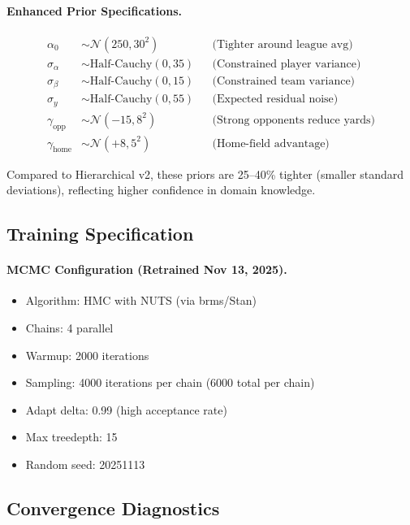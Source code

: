 \paragraph{Enhanced Prior Specifications.}
\begin{align}
\label{eq:ip-priors}
\alpha_0 &\sim \mathcal{N}(250, 30^2) && \text{(Tighter around league avg)} \\
\sigma_\alpha &\sim \text{Half-Cauchy}(0, 35) && \text{(Constrained player variance)} \\
\sigma_\beta &\sim \text{Half-Cauchy}(0, 15) && \text{(Constrained team variance)} \\
\sigma_y &\sim \text{Half-Cauchy}(0, 55) && \text{(Expected residual noise)} \\
\gamma_{\text{opp}} &\sim \mathcal{N}(-15, 8^2) && \text{(Strong opponents reduce yards)} \\
\gamma_{\text{home}} &\sim \mathcal{N}(+8, 5^2) && \text{(Home-field advantage)}
\end{align}

\noindent Compared to Hierarchical v2, these priors are 25--40\% tighter (smaller standard deviations), reflecting higher confidence in domain knowledge.

\subsection{Training Specification}

\paragraph{MCMC Configuration (Retrained Nov 13, 2025).}
\begin{itemize}[itemsep=1pt,parsep=0pt]
    \item Algorithm: HMC with NUTS (via brms/Stan)
    \item Chains: 4 parallel
    \item Warmup: 2000 iterations
    \item Sampling: 4000 iterations per chain (6000 total per chain)
    \item Adapt delta: 0.99 (high acceptance rate)
    \item Max treedepth: 15
    \item Random seed: 20251113
\end{itemize}

\subsection{Convergence Diagnostics}

